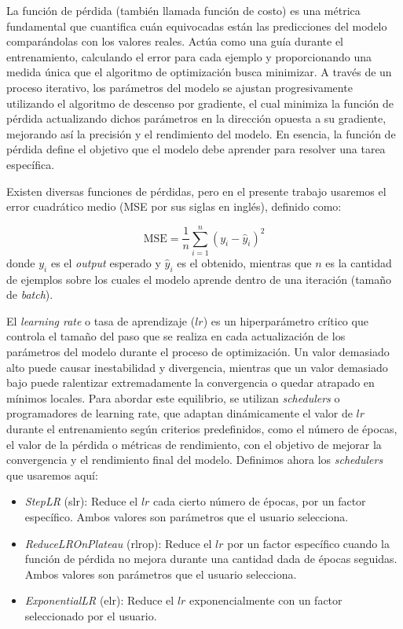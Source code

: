 La función de pérdida (también llamada función de costo) es una métrica fundamental que cuantifica cuán equivocadas están las predicciones del modelo comparándolas con los valores reales. Actúa como una guía durante el entrenamiento, calculando el error para cada ejemplo y proporcionando una medida única que el algoritmo de optimización busca minimizar. A través de un proceso iterativo, los parámetros del modelo se ajustan progresivamente utilizando el algoritmo de descenso por gradiente, el cual minimiza la función de pérdida actualizando dichos parámetros en la dirección opuesta a su gradiente, mejorando así la precisión y el rendimiento del modelo. En esencia, la función de pérdida define el objetivo que el modelo debe aprender para resolver una tarea específica.

Existen diversas funciones de pérdidas, pero en el presente trabajo usaremos el error cuadrático medio (MSE por sus siglas en inglés), definido como:

\begin{equation}
\text{MSE} = \frac{1}{n} \sum_{i=1}^{n} (y_i - \hat{y}_i)^2
\end{equation}
donde $y_i$ es el \emph{output} esperado y $\hat{y}_i$ es el obtenido, mientras que $n$ es la cantidad de ejemplos sobre los cuales el modelo aprende dentro de una iteración (tamaño de \emph{batch}).


El \emph{learning rate} o tasa de aprendizaje ($lr$) es un hiperparámetro crítico que controla el tamaño del paso que se realiza en cada actualización de los parámetros del modelo durante el proceso de optimización. Un valor demasiado alto puede causar inestabilidad y divergencia, mientras que un valor demasiado bajo puede ralentizar extremadamente la convergencia o quedar atrapado en mínimos locales. Para abordar este equilibrio, se utilizan \emph{schedulers} o programadores de learning rate, que adaptan dinámicamente el valor de $lr$ durante el entrenamiento según criterios predefinidos, como el número de épocas, el valor de la pérdida o métricas de rendimiento, con el objetivo de mejorar la convergencia y el rendimiento final del modelo. Definimos ahora los \emph{schedulers} que usaremos aquí:

\begin{itemize}
    \item \emph{StepLR} (slr): Reduce el $lr$ cada cierto número de épocas, por un factor específico. Ambos valores son parámetros que el usuario selecciona.
    
    \item \emph{ReduceLROnPlateau} (rlrop): Reduce el $lr$  por un factor específico cuando la función de pérdida no mejora durante una cantidad dada de épocas seguidas. Ambos valores son parámetros que el usuario selecciona.

    \item \emph{ExponentialLR} (elr): Reduce el $lr$ exponencialmente con un factor seleccionado por el usuario.
\end{itemize}

